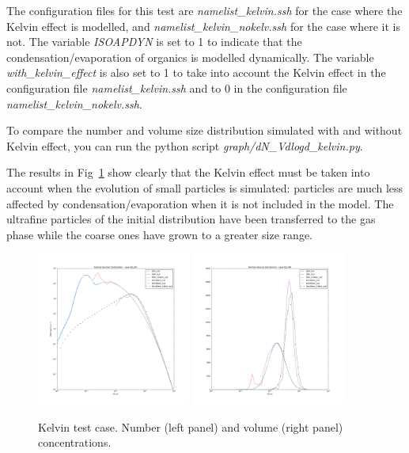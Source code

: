 \documentclass[a4paper,11pt]{article}
\begin{document}
The configuration files for this test are {\it{namelist\_kelvin.ssh}} for the
case where the Kelvin effect is modelled, and {\it{namelist\_kelvin\_nokelv.ssh}} for the
case where it is not.
The variable {\it{ISOAPDYN}} is set to 1 to indicate that the
condensation/evaporation of organics is modelled dynamically. The variable
{\it{with\_kelvin\_effect}} is also set to 1 to take into account the Kelvin
effect in the configuration file {\it{namelist\_kelvin.ssh}} and to 0 in the configuration file {\it{namelist\_kelvin\_nokelv.ssh}}.

To compare the number and volume size distribution simulated with and without
Kelvin effect, you can run the python script {\it{graph/dN\_Vdlogd\_kelvin.py}}.

The results in Fig~\ref{fig-kelvin} show clearly that the Kelvin effect must be taken into account when
the evolution of small particles is simulated: particles are much less affected by
condensation/evaporation when it is not included in the model. The ultrafine particles of the initial distribution have been transferred to the gas phase while the coarse ones have grown to a greater size range.



\begin{figure}[H]
        \begin{center}
                \includegraphics[angle=0,width=0.45\textwidth]{../graph/figure_ref/dNdlogd_KELVIN.png}
                \includegraphics[angle=0,width=0.45\textwidth]{../graph/figure_ref/dVdlogd_KELVIN.png}
        \end{center}
\caption{Kelvin test case. Number (left panel) and volume (right panel) concentrations.}
\label{fig-kelvin}
\end{figure}
       
\end{document}
